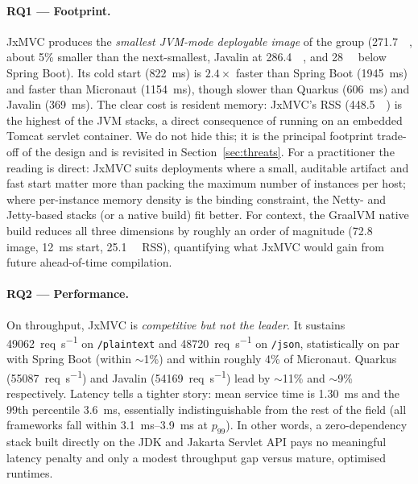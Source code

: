 \paragraph{RQ1 --- Footprint.} JxMVC produces the \emph{smallest
JVM-mode deployable image} of the group (\SI{271.7}{\mega\byte}, about
5\% smaller than the next-smallest, Javalin at
\SI{286.4}{\mega\byte}, and \SI{28}{\mega\byte} below Spring Boot).
Its cold start (\SI{822}{\milli\second}) is $2.4\times$ faster than
Spring Boot (\SI{1945}{\milli\second}) and faster than Micronaut
(\SI{1154}{\milli\second}), though slower than Quarkus
(\SI{606}{\milli\second}) and Javalin (\SI{369}{\milli\second}).
The clear cost is resident memory: JxMVC's RSS
(\SI{448.5}{\mega\byte}) is the highest of the JVM stacks, a direct
consequence of running on an embedded Tomcat servlet container. We do
not hide this; it is the principal footprint trade-off of the design
and is revisited in Section~\ref{sec:threats}. For a practitioner the
reading is direct: JxMVC suits deployments where a small, auditable
artifact and fast start matter more than packing the maximum number of
instances per host; where per-instance memory density is the binding
constraint, the Netty- and Jetty-based stacks (or a native build) fit
better. For context, the
GraalVM native build reduces all three dimensions by roughly an order
of magnitude (\SI{72.8}{\mega\byte} image, \SI{12}{\milli\second}
start, \SI{25.1}{\mega\byte} RSS), quantifying what JxMVC would gain
from future ahead-of-time compilation.

\paragraph{RQ2 --- Performance.} On throughput, JxMVC is
\emph{competitive but not the leader}. It sustains
\SI{49062}{req\per\second} on \texttt{/plaintext} and
\SI{48720}{req\per\second} on \texttt{/json}, statistically on par
with Spring Boot (within $\sim$1\%) and within roughly 4\% of
Micronaut. Quarkus (\SI{55087}{req\per\second}) and Javalin
(\SI{54169}{req\per\second}) lead by $\sim$11\% and $\sim$9\%
respectively. Latency tells a tighter story: mean service time is
\SI{1.30}{\milli\second} and the 99th percentile
\SI{3.6}{\milli\second}, essentially indistinguishable from the rest
of the field (all frameworks fall within \SIrange{3.1}{3.9}{\milli\second}
at $p_{99}$). In other words, a zero-dependency stack built directly
on the JDK and Jakarta Servlet API pays no meaningful latency penalty
and only a modest throughput gap versus mature, optimised runtimes.

